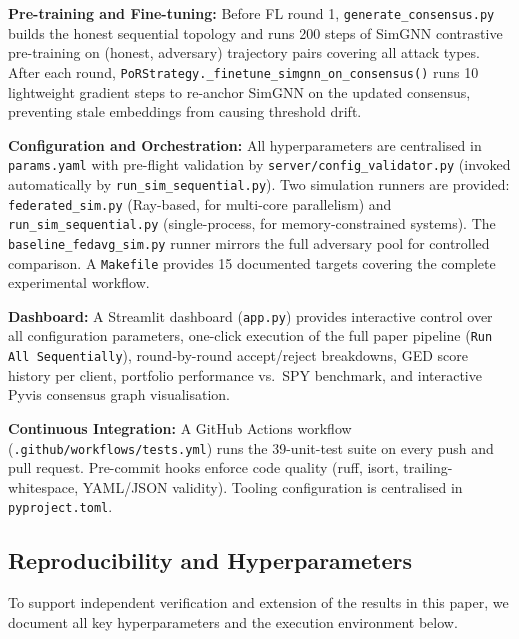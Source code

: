 \documentclass[journal]{IEEEtran}
\begin{document}
\textbf{Pre-training and Fine-tuning:}
Before FL round 1, \texttt{generate\_consensus.py} builds the honest sequential topology and runs 200 steps of SimGNN contrastive pre-training on (honest, adversary) trajectory pairs covering all attack types. After each round, \texttt{PoRStrategy.\_finetune\_simgnn\_on\_consensus()} runs 10 lightweight gradient steps to re-anchor SimGNN on the updated consensus, preventing stale embeddings from causing threshold drift.

\textbf{Configuration and Orchestration:}
All hyperparameters are centralised in \texttt{params.yaml} with pre-flight validation by \texttt{server/config\_validator.py} (invoked automatically by \texttt{run\_sim\_sequential.py}). Two simulation runners are provided: \texttt{federated\_sim.py} (Ray-based, for multi-core parallelism) and \texttt{run\_sim\_sequential.py} (single-process, for memory-constrained systems). The \texttt{baseline\_fedavg\_sim.py} runner mirrors the full adversary pool for controlled comparison. A \texttt{Makefile} provides 15 documented targets covering the complete experimental workflow.

\textbf{Dashboard:}
A Streamlit dashboard (\texttt{app.py}) provides interactive control over all configuration parameters, one-click execution of the full paper pipeline (\texttt{Run All Sequentially}), round-by-round accept/reject breakdowns, GED score history per client, portfolio performance vs.\ SPY benchmark, and interactive Pyvis consensus graph visualisation.

\textbf{Continuous Integration:}
A GitHub Actions workflow (\texttt{.github/workflows/tests.yml}) runs the 39-unit-test suite on every push and pull request. Pre-commit hooks enforce code quality (ruff, isort, trailing-whitespace, YAML/JSON validity). Tooling configuration is centralised in \texttt{pyproject.toml}.

\subsection{Reproducibility and Hyperparameters}
To support independent verification and extension of the results in this paper, we document all key hyperparameters and the execution environment below.
\end{document}
